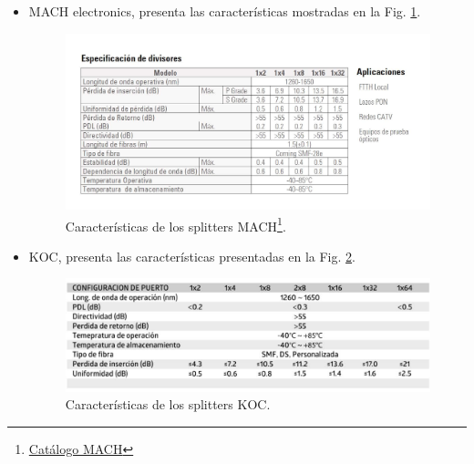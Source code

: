 \documentclass[11pt,a4paper]{article}
\begin{document}
  \begin{itemize}
    \item  MACH electronics, presenta las características mostradas en la Fig. \ref{fig:splitters_mach}.

    \begin{figure}[htbp]
      \centering
      \includegraphics[width=0.8\linewidth]{fotos_ema/splitters_mach.jpg}
      \caption{Características de los splitters MACH\protect\footnote{\href{https://mach.com.ar/backend/views/images/categoria/editado658.pdf}{Catálogo MACH}}.}
      \label{fig:splitters_mach}
    \end{figure}
 
    \item  KOC, presenta las características presentadas en la Fig. \ref{fig:splitters_koc}.
    
    \begin{figure}[htbp]
      \centering
      \includegraphics[width=0.8\linewidth]{fotos_ema/splitters_koc.jpg}
      \caption{Características de los splitters KOC.}
      \label{fig:splitters_koc}
    \end{figure}

    \end{itemize}
\end{document}
